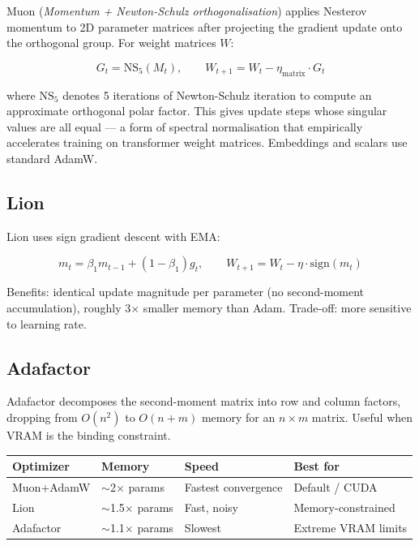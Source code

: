 \documentclass[12pt, a4paper]{article}
\begin{document}
Muon (\emph{Momentum + Newton-Schulz orthogonalisation}) applies Nesterov momentum to
2D parameter matrices after projecting the gradient update onto the orthogonal group.
For weight matrices $W$:

\begin{equation}
  G_t = \text{NS}_5(M_t), \qquad W_{t+1} = W_t - \eta_{\text{matrix}} \cdot G_t
\end{equation}

where $\text{NS}_5$ denotes 5 iterations of Newton-Schulz iteration to compute an
approximate orthogonal polar factor. This gives update steps whose singular values are all
equal — a form of spectral normalisation that empirically accelerates training on transformer
weight matrices. Embeddings and scalars use standard AdamW.

\subsection{Lion}

Lion uses sign gradient descent with EMA:

\begin{equation}
  m_t = \beta_1 m_{t-1} + (1-\beta_1)g_t, \qquad
  W_{t+1} = W_t - \eta \cdot \text{sign}(m_t)
\end{equation}

Benefits: identical update magnitude per parameter (no second-moment accumulation),
roughly 3$\times$ smaller memory than Adam. Trade-off: more sensitive to learning rate.

\subsection{Adafactor}

Adafactor decomposes the second-moment matrix into row and column factors, dropping from
$O(n^2)$ to $O(n + m)$ memory for an $n \times m$ matrix. Useful when VRAM is the binding
constraint.

\begin{center}
\begin{tabular}{@{}llll@{}}
\toprule
\textbf{Optimizer} & \textbf{Memory} & \textbf{Speed} & \textbf{Best for} \\
\midrule
Muon+AdamW & $\sim$2$\times$ params & Fastest convergence & Default / CUDA \\
Lion       & $\sim$1.5$\times$ params & Fast, noisy & Memory-constrained \\
Adafactor  & $\sim$1.1$\times$ params & Slowest & Extreme VRAM limits \\
\bottomrule
\end{tabular}
\end{center}
\end{document}
